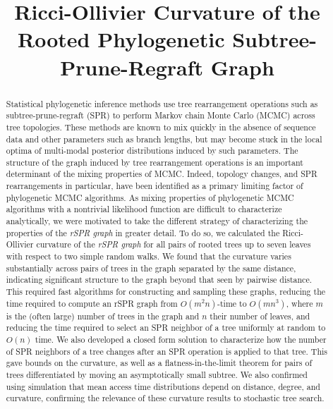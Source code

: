 \documentclass[11pt,onecolumn,conference]{IEEEtran}
\begin{document}
\title{Ricci-Ollivier Curvature of the Rooted Phylogenetic Subtree-Prune-Regraft Graph}

\author{
	\and
}

\maketitle
\IEEEpeerreviewmaketitle

\begin{abstract}
Statistical phylogenetic inference methods use tree rearrangement operations such as subtree-prune-regraft (SPR) to perform Markov chain Monte Carlo (MCMC) across tree topologies.
These methods are known to mix quickly in the absence of sequence data and other parameters such as branch lengths, but may become stuck in the local optima of multi-modal posterior distributions induced by such parameters.
The structure of the graph induced by tree rearrangement operations is an important determinant of the mixing properties of MCMC.
Indeed, topology changes, and SPR rearrangements in particular, have been identified as a primary limiting factor of phylogenetic MCMC algorithms.
As mixing properties of phylogenetic MCMC algorithms with a nontrivial likelihood function are difficult to characterize analytically, we were motivated to take the different strategy of characterizing the properties of the \emph{rSPR graph} in greater detail.
To do so, we calculated the Ricci-Ollivier curvature of the \emph{rSPR graph} for all pairs of rooted trees up to seven leaves with respect to two simple random walks.
We found that the curvature varies substantially across pairs of trees in the graph separated by the same distance, indicating significant structure to the graph beyond that seen by pairwise distance.
This required fast algorithms for constructing and sampling these graphs, reducing the time required to compute an rSPR graph from $O(m^2n)$-time to $O(mn^3)$, where $m$ is the (often large) number of trees in the graph and $n$ their number of leaves, and reducing the time required to select an SPR neighbor of a tree uniformly at random to $O(n)$ time.
We also developed a closed form solution to characterize how the number of SPR neighbors of a tree changes after an SPR operation is applied to that tree.
This gave bounds on the curvature, as well as a flatness-in-the-limit theorem for pairs of trees differentiated by moving an asymptotically small subtree.
We also confirmed using simulation that mean access time distributions depend on distance, degree, and curvature, confirming the relevance of these curvature results to stochastic tree search.

\end{abstract}
\end{document}
